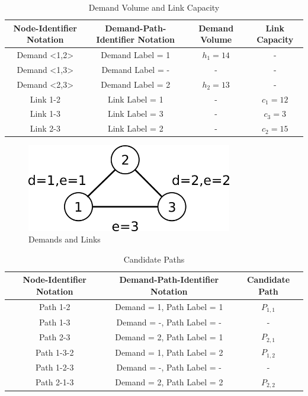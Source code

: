 \begin{table}[H]
	\centering
	\caption{Demand Volume and Link Capacity}
	\label{tab:a_demand}
	\begin{tabular}{||c|c|c|c||}
	\hline
	\rowcolor{gray!50}
	Node-Identifier Notation & Demand-Path-Identifier Notation & Demand
	Volume & Link Capacity \\
	\hline
	Demand <1,2> & Demand Label = 1 & $h_1 = 14$ & - \\
	Demand <1,3> & Demand Label = - & - & - \\
	Demand <2,3> & Demand Label = 2 & $h_2 = 13$ & - \\
	Link 1-2 & Link Label = 1 & - & $c_1 = 12$ \\
	Link 1-3 & Link Label = 3 & - & $c_3 = 3$ \\
	Link 2-3 & Link Label = 2 & - & $c_2 = 15$ \\
	\hline \hline
	\end{tabular}
\end{table}

\begin{figure}[H]
	\centering
	\includegraphics[width=0.8\textwidth]{images/q2}
	\caption{Demands and Links}
	\label{fig:images-q2}
\end{figure}

\begin{table}[H]
	\centering
	\caption{Candidate Paths}
	\label{tab:a_paths}
	\begin{tabular}{||c|c|c||}
	\hline
	\rowcolor{gray!50}
	Node-Identifier Notation & Demand-Path-Identifier Notation & Candidate
	Path \\
	\hline
	Path 1-2 & Demand = 1, Path Label = 1 & $P_{1,1}$ \\
	Path 1-3 & Demand = -, Path Label = - & - \\
	Path 2-3 & Demand = 2, Path Label = 1 & $P_{2,1}$ \\
	Path 1-3-2 & Demand = 1, Path Label = 2 & $P_{1,2}$ \\
	Path 1-2-3 & Demand = -, Path Label = - & - \\
	Path 2-1-3 & Demand = 2, Path Label = 2 & $P_{2,2}$ \\
	\hline \hline
	\end{tabular}
\end{table}

